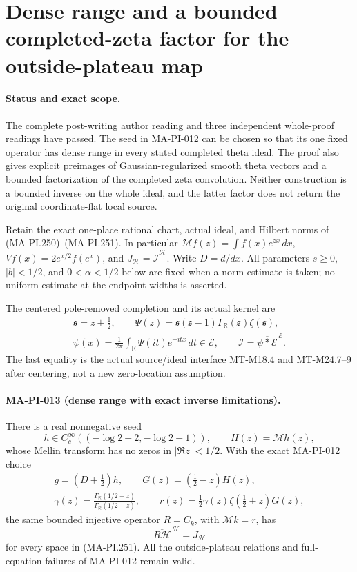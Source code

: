 \section{Dense range and a bounded completed-zeta factor for the outside-plateau map}
\label{sec:dense-outside-transport}

\paragraph{Status and exact scope.}
The complete post-writing author reading and three independent
whole-proof readings have passed.
The seed in MA-PI-012 can be chosen so that its one fixed
operator has dense range in every stated completed theta ideal.
The proof also gives explicit preimages of Gaussian-regularized
smooth theta vectors and a bounded factorization of the completed
zeta convolution.  Neither construction is a bounded inverse on
the whole ideal, and the latter factor does not return the
original coordinate-flat local source.

Retain the exact one-place rational chart, actual ideal, and
Hilbert norms of (MA-PI.250)--(MA-PI.251).  In particular
\(\mathcal Mf(z)=\int f(x)e^{zx}\,dx\),
\(Vf(x)=2e^{x/2}f(e^x)\), and
\(J_{\mathscr H}=\overline{\mathscr I}^{\mathscr H}\).
Write \(D=d/dx\).  All parameters \(s\ge0\),
\(|b|<1/2\), and \(0<\alpha<1/2\) below are fixed when a
norm estimate is taken; no uniform estimate at the endpoint
widths is asserted.

The centered pole-removed completion and its actual kernel are
\[
 \begin{gathered}
 \mathfrak s=z+\tfrac12,\qquad
 \Psi(z)=\mathfrak s(\mathfrak s-1)
       \Gamma_{\mathbb R}(\mathfrak s)\zeta(\mathfrak s),\\
 \psi(x)=\frac1{2\pi}\int_{\mathbb R}\Psi(it)e^{-itx}\,dt
       \in\mathcal E,\qquad
 \mathscr I=\overline{\psi*\mathcal E}^{\,\mathcal E}.
 \end{gathered}
 \tag{MA-PI.280}
\]
The last equality is the actual source/ideal interface
MT-M18.4 and MT-M24.7--9 after centering, not a new
zero-location assumption.

\paragraph{MA-PI-013 (dense range with exact inverse limitations).}
There is a real nonnegative seed
\[
 h\in C_c^\infty((-\log2-2,-\log2-1)),\qquad
 H(z)=\mathcal Mh(z),
 \tag{MA-PI.281}
\]
whose Mellin transform has no zeros in \(|\Re z|<1/2\).
With the exact MA-PI-012 choice
\[
 \begin{gathered}
 g=(D+\tfrac12)h,\qquad G(z)=(\tfrac12-z)H(z),\\
 \gamma(z)=
  \frac{\Gamma_{\mathbb R}(1/2-z)}
       {\Gamma_{\mathbb R}(1/2+z)},\qquad
 r(z)=\tfrac12\gamma(z)\zeta(\tfrac12+z)G(z),
 \end{gathered}
 \tag{MA-PI.282}
\]
the same bounded injective operator \(R=C_k\), with
\(\mathcal Mk=r\), has
\[
             \overline{R\mathscr H}^{\,\mathscr H}
                    =J_{\mathscr H}
 \tag{MA-PI.283}
\]
for every space in (MA-PI.251).  All the outside-plateau
relations and full-equation failures of MA-PI-012 remain valid.

